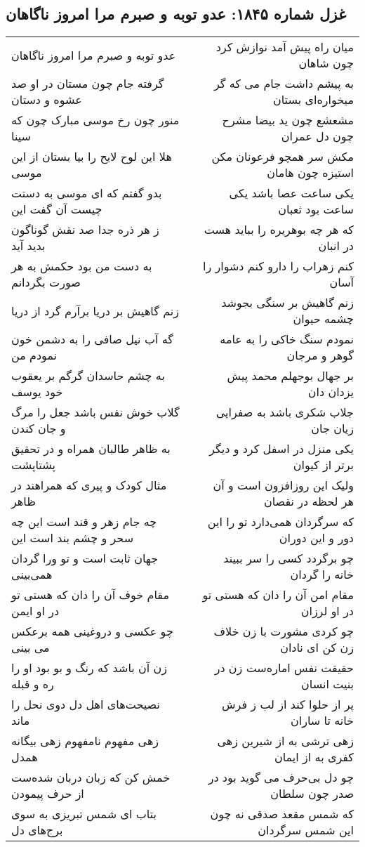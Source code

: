 \begin{center}
\section*{غزل شماره ۱۸۴۵: عدو توبه و صبرم مرا امروز ناگاهان}
\label{sec:1845}
\begin{longtable}{l p{0.5cm} r}
عدو توبه و صبرم مرا امروز ناگاهان
&&
میان راه پیش آمد نوازش کرد چون شاهان
\\
گرفته جام چون مستان در او صد عشوه و دستان
&&
به پیشم داشت جام می که گر میخواره‌ای بستان
\\
منور چون رخ موسی مبارک چون که سینا
&&
مشعشع چون ید بیضا مشرح چون دل عمران
\\
هلا این لوح لایح را بیا بستان از این موسی
&&
مکش سر همچو فرعونان مکن استیزه چون هامان
\\
بدو گفتم که ای موسی به دستت چیست آن گفت این
&&
یکی ساعت عصا باشد یکی ساعت بود ثعبان
\\
ز هر ذره جدا صد نقش گوناگون بدید آید
&&
که هر چه بوهریره را بباید هست در انبان
\\
به دست من بود حکمش به هر صورت بگردانم
&&
کنم زهراب را دارو کنم دشوار را آسان
\\
زنم گاهیش بر دریا برآرم گرد از دریا
&&
زنم گاهیش بر سنگی بجوشد چشمه حیوان
\\
گه آب نیل صافی را به دشمن خون نمودم من
&&
نمودم سنگ خاکی را به عامه گوهر و مرجان
\\
به چشم حاسدان گرگم بر یعقوب خود یوسف
&&
بر جهال بوجهلم محمد پیش یزدان دان
\\
گلاب خوش نفس باشد جعل را مرگ و جان کندن
&&
جلاب شکری باشد به صفرایی زیان جان
\\
به ظاهر طالبان همراه و در تحقیق پشتاپشت
&&
یکی منزل در اسفل کرد و دیگر برتر از کیوان
\\
مثال کودک و پیری که همراهند در ظاهر
&&
ولیک این روزافزون است و آن هر لحظه در نقصان
\\
چه جام زهر و قند است این چه سحر و چشم بند است این
&&
که سرگردان همی‌دارد تو را این دور و این دوران
\\
جهان ثابت است و تو ورا گردان همی‌بینی
&&
چو برگردد کسی را سر ببیند خانه را گردان
\\
مقام خوف آن را دان که هستی تو در او ایمن
&&
مقام امن آن را دان که هستی تو در او لرزان
\\
چو عکسی و دروغینی همه برعکس می بینی
&&
چو کردی مشورت با زن خلاف زن کن ای نادان
\\
زن آن باشد که رنگ و بو بود او را ره و قبله
&&
حقیقت نفس اماره‌ست زن در بنیت انسان
\\
نصیحت‌های اهل دل دوی نحل را ماند
&&
پر از حلوا کند از لب ز فرش خانه تا ساران
\\
زهی مفهوم نامفهوم زهی بیگانه همدل
&&
زهی ترشی به از شیرین زهی کفری به از ایمان
\\
خمش کن که زبان دربان شده‌ست از حرف پیمودن
&&
چو دل بی‌حرف می گوید بود در صدر چون سلطان
\\
بتاب ای شمس تبریزی به سوی برج‌های دل
&&
که شمس مقعد صدقی نه چون این شمس سرگردان
\\
\end{longtable}
\end{center}
